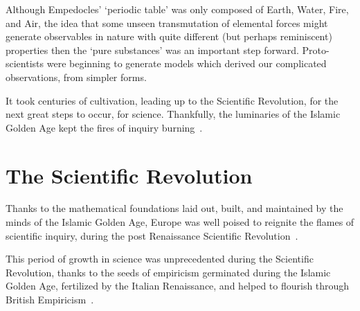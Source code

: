 Although Empedocles' `periodic table' was only composed of Earth, Water, Fire,
and Air, the idea that some unseen transmutation of elemental forces might
generate observables in nature with quite different (but perhaps reminiscent)
properties then the `pure substances' was an important step forward.
Proto-scientists were beginning to generate models which derived our complicated
observations, from simpler forms.

It took centuries of cultivation, leading up to the Scientific Revolution, for
the next great steps to occur, for science. Thankfully, the luminaries of the
Islamic Golden Age kept the fires of inquiry burning~\cite{Alexakos2005}.

\clearpage
\section{The Scientific Revolution}

Thanks to the mathematical foundations laid out, built, and maintained by the
minds of the Islamic Golden Age, Europe was well poised to reignite the flames
of scientific inquiry, during the post Renaissance Scientific
Revolution~\cite{Alexakos2005}.

This period of growth in science was unprecedented during the Scientific
Revolution, thanks to the seeds of empiricism germinated during the Islamic
Golden Age, fertilized by the Italian Renaissance, and helped to flourish
through British Empiricism~\cite{Cowley1968}.

